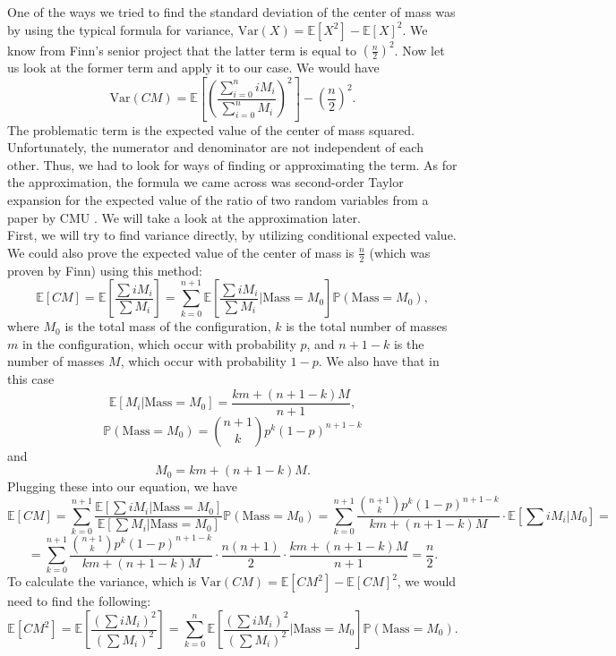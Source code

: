 \documentclass[11pt, twoside, reqno]{book}
\newcommand{\Var}{\text{Var}}
\newcommand{\E}{\mathbb{E}}
\begin{document}
One of the ways we tried to find the standard deviation of the center of mass was by using the typical formula for variance, $\Var (X) = \mathbb{E} [X^{2}] - \mathbb{E}[X]^{2}$. We know from Finn's senior project that the latter term is equal to $\left(\frac{n}{2}\right)^{2}$. Now let us look at the former term and apply it to our case. We would have  
$$\Var (CM) = \mathbb{E}\left[\left(\frac{\sum^{n}_{i=0} iM_{i}}{\sum^{n}_{i=0}M_{i}}\right)^{2}\right] - \left(\frac{n}{2}\right)^{2}.$$
The problematic term is the expected value of the center of mass squared. Unfortunately, the numerator and denominator are not independent of each other. Thus, we had to look for ways of finding or approximating the term. As for the approximation, the formula we came across was second-order Taylor expansion for the expected value of the ratio of two random variables from a paper by CMU \cite{Bib3}. We will take a look at the approximation later. \\
First, we will try to find variance directly, by utilizing conditional expected value. We could also prove the expected value of the center of mass is $\frac{n}{2}$ (which was proven by Finn) using this method:
$$\E[CM] = \E\left[\frac{\sum iM_{i}}{\sum M_{i}} \right] = \sum^{n+1}_{k=0} \E\left[ \frac{\sum iM_{i}}{\sum M_{i}}  \Bigg| \text{Mass} = M_{0} \right] \mathbb{P} (\text{Mass} = M_{0}),$$
where $M_{0}$ is the total mass of the configuration, $k$ is the total number of masses $m$ in the configuration, which occur with probability $p$, and $n+1-k$ is the number of masses $M$, which occur with probability $1-p$.
We also have that in this case
$$\E [M_{i} | \text{Mass} = M_{0}] = \frac{km+(n+1-k)M}{n+1},$$
$$\mathbb{P}(\text{Mass} = M_{0}) = \binom{n+1}{k} p^{k} (1-p)^{n+1-k}$$ and
$$M_{0} = km+(n+1-k)M.$$
Plugging these into our equation, we have
$$\E[CM] = \sum_{k=0}^{n+1} \frac{\E\left[\sum iM_{i} | \text{Mass} = M_{0} \right]}{\E\left[\sum M_{i} | \text{Mass} = M_{0} \right]} \mathbb{P} (\text{Mass} = M_{0}) = \sum_{k=0}^{n+1} \frac{\binom{n+1}{k}p^{k}(1-p)^{n+1-k}}{km+(n+1-k)M} \cdot \E\left[\sum iM_{i} | M_{0}\right]=$$
$$=\sum_{k=0}^{n+1} \frac{\binom{n+1}{k}p^{k}(1-p)^{n+1-k}}{km+(n+1-k)M} \cdot  \frac{n(n+1)}{2} \cdot \frac{km+(n+1-k)M}{n+1} = \frac{n}{2}.$$
To calculate the variance, which is $\Var(CM)=\E[CM^{2}]-\E[CM]^{2}$, we would need to find the following:
$$\E[CM^{2}] = \E\left[\frac{\left(\sum iM_{i}\right)^2}{\left(\sum M_{i} \right)^2} \right] = \sum^{n}_{k=0} \E\left[ \frac{\left(\sum iM_{i}\right)^2}{\left(\sum M_{i}\right)^2}  \Bigg| \text{Mass} = M_{0} \right] \mathbb{P} (\text{Mass} = M_{0}).$$
\end{document}
